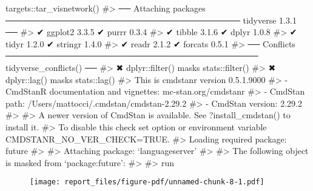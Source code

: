 \documentclass[
  11pt,
  letterpaper,
  DIV=11,
  numbers=noendperiod]{scrartcl}
\newenvironment{Shaded}{}{}
\newcommand{\CommentTok}[1]{\textcolor[rgb]{0.42,0.45,0.49}{#1}}
\newcommand{\FunctionTok}[1]{\textcolor[rgb]{0.44,0.26,0.76}{#1}}
\newcommand{\NormalTok}[1]{\textcolor[rgb]{0.14,0.16,0.18}{#1}}
\newcommand{\SpecialCharTok}[1]{\textcolor[rgb]{0.00,0.36,0.77}{#1}}
\begin{document}
\begin{Shaded}
\begin{Highlighting}[]
\NormalTok{targets}\SpecialCharTok{::}\FunctionTok{tar\_visnetwork}\NormalTok{()}
\CommentTok{\#\textgreater{} ── Attaching packages ─────────────────────────────────────── tidyverse 1.3.1 ──}
\CommentTok{\#\textgreater{} ✔ ggplot2 3.3.5     ✔ purrr   0.3.4}
\CommentTok{\#\textgreater{} ✔ tibble  3.1.6     ✔ dplyr   1.0.8}
\CommentTok{\#\textgreater{} ✔ tidyr   1.2.0     ✔ stringr 1.4.0}
\CommentTok{\#\textgreater{} ✔ readr   2.1.2     ✔ forcats 0.5.1}
\CommentTok{\#\textgreater{} ── Conflicts ────────────────────────────────────────── tidyverse\_conflicts() ──}
\CommentTok{\#\textgreater{} ✖ dplyr::filter() masks stats::filter()}
\CommentTok{\#\textgreater{} ✖ dplyr::lag()    masks stats::lag()}
\CommentTok{\#\textgreater{} This is cmdstanr version 0.5.1.9000}
\CommentTok{\#\textgreater{} {-} CmdStanR documentation and vignettes: mc{-}stan.org/cmdstanr}
\CommentTok{\#\textgreater{} {-} CmdStan path: /Users/mattocci/.cmdstan/cmdstan{-}2.29.2}
\CommentTok{\#\textgreater{} {-} CmdStan version: 2.29.2}
\CommentTok{\#\textgreater{} }
\CommentTok{\#\textgreater{} A newer version of CmdStan is available. See ?install\_cmdstan() to install it.}
\CommentTok{\#\textgreater{} To disable this check set option or environment variable CMDSTANR\_NO\_VER\_CHECK=TRUE.}
\CommentTok{\#\textgreater{} Loading required package: future}
\CommentTok{\#\textgreater{} }
\CommentTok{\#\textgreater{} Attaching package: ‘languageserver’}
\CommentTok{\#\textgreater{} }
\CommentTok{\#\textgreater{} The following object is masked from ‘package:future’:}
\CommentTok{\#\textgreater{} }
\CommentTok{\#\textgreater{}     run}
\end{Highlighting}
\end{Shaded}

\begin{figure}[H]

{\centering \texttt{[image: report\_files/figure-pdf/unnamed-chunk-8-1.pdf]}

}

\end{figure}
\end{document}
